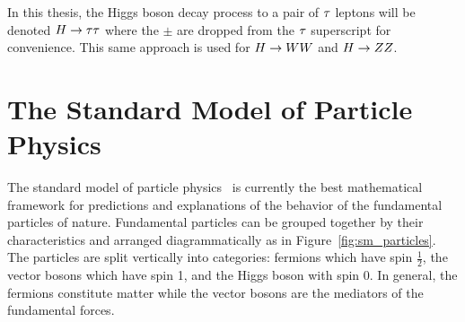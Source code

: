 
In this thesis, the Higgs boson decay process to a pair of $\tau$ leptons will be denoted
$H\to\tau\tau$ where the $\pm$ are dropped from the $\tau$ superscript
for convenience. This same approach is used for $H\to WW$ and $H\to ZZ$.


\section{The Standard Model of Particle Physics}
The standard model of particle physics~\cite{Glashow:1961tr,SM1,SM3} is currently
the best mathematical framework for predictions and explanations of the behavior
of the fundamental particles of nature. Fundamental particles can be grouped
together by their characteristics and arranged diagrammatically as in
Figure~\ref{fig:sm_particles}. The particles are split vertically into categories:
fermions which have spin $\frac{1}{2}$, the vector bosons which have spin 1, and
the Higgs boson with spin 0. In general, the fermions constitute 
matter while the vector bosons are the mediators of the fundamental forces.

